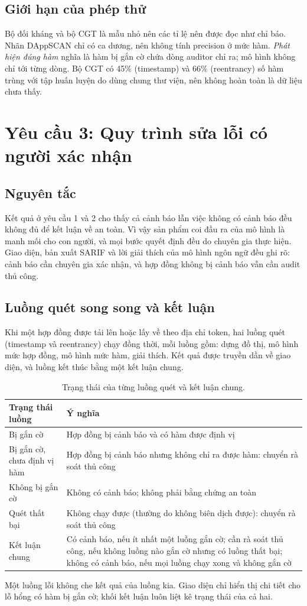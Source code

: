 \documentclass[12pt,a4paper]{article}
\begin{document}
\subsection{Giới hạn của phép thử}
Bộ đối kháng và bộ CGT là mẫu nhỏ nên các tỉ lệ nên được đọc như chỉ báo. Nhãn DAppSCAN chỉ có ca dương, nên không tính precision ở mức hàm. \emph{Phát hiện đúng hàm} nghĩa là hàm bị gắn cờ chứa dòng auditor chỉ ra; mô hình không chỉ tới từng dòng. Bộ CGT có 45\% (timestamp) và 66\% (reentrancy) số hàm trùng với tập huấn luyện do dùng chung thư viện, nên không hoàn toàn là dữ liệu chưa thấy.

\section{Yêu cầu 3: Quy trình sửa lỗi có người xác nhận}
\subsection{Nguyên tắc}
Kết quả ở yêu cầu 1 và 2 cho thấy cả cảnh báo lẫn việc không có cảnh báo đều không đủ để kết luận về an toàn. Vì vậy sản phẩm coi đầu ra của mô hình là manh mối cho con người, và mọi bước quyết định đều do chuyên gia thực hiện. Giao diện, bản xuất SARIF và lời giải thích của mô hình ngôn ngữ đều ghi rõ: cảnh báo cần chuyên gia xác nhận, và hợp đồng không bị cảnh báo vẫn cần audit thủ công.

\subsection{Luồng quét song song và kết luận}
Khi một hợp đồng được tải lên hoặc lấy về theo địa chỉ token, hai luồng quét (timestamp và reentrancy) chạy đồng thời, mỗi luồng gồm: dựng đồ thị, mô hình mức hợp đồng, mô hình mức hàm, giải thích. Kết quả được truyền dần về giao diện, và luồng kết thúc bằng một kết luận chung.
\begin{table}[H]\centering\small
\caption{Trạng thái của từng luồng quét và kết luận chung.}\label{tab:status}
\begin{tabularx}{\textwidth}{lY}
\toprule
Trạng thái luồng & Ý nghĩa\\
\midrule
Bị gắn cờ & Hợp đồng bị cảnh báo và có hàm được định vị\\
Bị gắn cờ, chưa định vị hàm & Hợp đồng bị cảnh báo nhưng không chỉ ra được hàm: chuyển rà soát thủ công\\
Không bị gắn cờ & Không có cảnh báo; không phải bằng chứng an toàn\\
Quét thất bại & Không chạy được (thường do không biên dịch được): chuyển rà soát thủ công\\
\midrule
Kết luận chung & Có cảnh báo, nếu ít nhất một luồng gắn cờ; cần rà soát thủ công, nếu không luồng nào gắn cờ nhưng có luồng thất bại; không có cảnh báo, nếu mọi luồng chạy xong và không gắn cờ\\
\bottomrule
\end{tabularx}
\end{table}
Một luồng lỗi không che kết quả của luồng kia. Giao diện chỉ hiển thị chi tiết cho lỗ hổng có hàm bị gắn cờ; khối kết luận luôn liệt kê trạng thái của cả hai.
\end{document}
